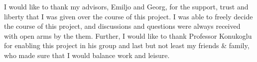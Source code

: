 %

I would like to thank my advisors, Emiljo and Georg, for the support, trust and liberty that I was given over the course of this project. I was able to freely decide the course of this project, and discussions and questions were always received with open arms by the them. Further, I would like to thank Professor Konukoglu for enabling this project in his group and last but not least my friends \& family, who made sure that I would balance work and leisure.